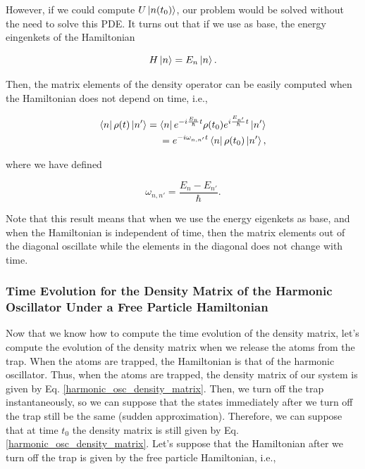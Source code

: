 \documentclass{article}
\begin{document}
However, if we could compute $U \ket{n(t_{0})}$, our problem would be solved without the need to solve this PDE. It turns out that if we use as base, the energy eingenkets of the Hamiltonian

\begin{equation}
    H \ket{n} = E_{n} \ket{n}.
\end{equation}

Then, the matrix elements of the density operator can be easily computed when the Hamiltonian does not depend on time, i.e.,

\begin{equation}\label{time_evol_density_h_independent_time}
   \begin{split}
       \bra{n} \rho(t) \ket{n'} = \bra{n} e^{-i\frac{E_{n}}{\hbar} t} \rho(t_{0}) e^{i\frac{E_{n'}}{\hbar} t} \ket{n'} \\ = e^{-i \omega_{n,n'} t} \bra{n} \rho(t_{0}) \ket{n'},
   \end{split}
\end{equation}

where we have defined

\begin{equation}
    \omega_{n,n'} = \frac{E_{n}-E_{n'}}{\hbar}.
\end{equation}

Note that this result means that when we use the energy eigenkets as base, and when the Hamiltonian is independent of time, then the matrix elements out of the diagonal oscillate while the elements in the diagonal does not change with time.

\subsubsection{Time Evolution for the Density Matrix of the Harmonic Oscillator Under a Free Particle Hamiltonian}
Now that we know how to compute the time evolution of the density matrix, let's compute the evolution of the density matrix when we release the atoms from the trap. When the atoms are trapped, the Hamiltonian is that of the harmonic oscillator. Thus, when the atoms are trapped, the density matrix of our system is given by Eq. \ref{harmonic_osc_density_matrix}. Then, we turn off the trap instantaneously, so we can suppose that the states immediately after we turn off the trap still be the same (sudden approximation). Therefore, we can suppose that at time $t_{0}$ the density matrix is still given by Eq. \ref{harmonic_osc_density_matrix}. Let's suppose that the Hamiltonian after we turn off the trap is given by the free particle Hamiltonian, i.e.,
\end{document}

